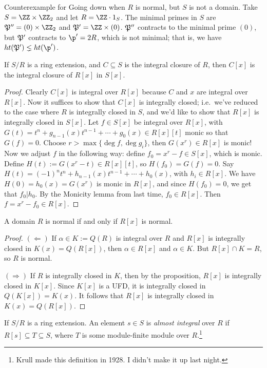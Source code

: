  \begin{example}
   Counterexample for Going down when $R$ is normal, but $S$ is not a domain. Take
   $S=\ZZ\times \ZZ_2$ and let $R=\ZZ\cdot 1_S$. The minimal primes in $S$ are
   $\P''=(0)\times \ZZ_2$ and $\P'=\ZZ\times (0)$. $\P''$ contracts to
   the minimal prime $(0)$, but $\P'$ contracts to $\p'=2R$, which is not minimal; that
   is, we have $ht(\P')\lneq ht(\p')$.
 \end{example}

 \begin{proposition}
   If $S/R$ is a ring extension, and $C\subseteq S$ is the integral closure of $R$, then
   $C[x]$ is the integral closure of $R[x]$ in $S[x]$.
 \end{proposition}
 \begin{proof}
   Clearly $C[x]$ is integral over $R[x]$ because $C$ and $x$ are integral over $R[x]$.
   Now it suffices to show that $C[x]$ is integrally closed; i.e.~we've reduced to the
   case where $R$ is integrally closed in $S$, and we'd like to show that $R[x]$ is
   integrally closed in $S[x]$. Let $f\in S[x]$ be integral over $R[x]$, with
   $G(t)=t^n+g_{n-1}(x)t^{n-1}+\cdots+g_0(x)\in R[x][t]$ monic so that $G(f)=0$. Choose
   $r> \max\{\deg f, \deg g_i\}$, then $G(x^r)\in R[x]$ is monic! Now we adjust $f$ in
   the following way: define $f_0=x^r-f\in S[x]$, which is monic. Define
   $H(t):=G(x^r-t)\in R[x][t]$, so $H(f_0)=G(f)=0$. Say $H(t)=(-1)^nt^n +
   h_{n-1}(x)t^{n-1}+\cdots+h_0(x)$, with $h_i\in R[x]$. We have $H(0)=h_0(x)=G(x^r)$ is
   monic in $R[x]$, and since $H(f_0)=0$, we get that $f_0|h_0$. By the Monicity lemma
   from last time, $f_0\in R[x]$. Then $f=x^r-f_0\in R[x]$.
 \end{proof}
 \begin{theorem}
   A domain $R$ is normal if and only if $R[x]$ is normal.
 \end{theorem}
 \begin{proof}
   $(\Leftarrow)$ If $\alpha\in K:=Q(R)$ is integral over $R$ and $R[x]$ is integrally
   closed in $K(x)=Q(R[x])$, then $\alpha\in R[x]$ and $\alpha\in K$. But $R[x]\cap K=R$,
   so $R$ is normal.

   $(\Rightarrow)$ If $R$ is integrally closed in $K$, then by the proposition, $R[x]$ is
   integrally closed in $K[x]$. Since $K[x]$ is a UFD, it is integrally closed in
   $Q(K[x])=K(x)$. It follows that $R[x]$ is integrally closed in $K(x)=Q(R[x])$.
 \end{proof}
 \begin{definition}
   If $S/R$ is a ring extension. An element $s\in S$ is \emph{almost integral} over $R$
   if $R[s]\subseteq T\subseteq S$, where $T$ is some module-finite module over
   $R$.\footnote{Krull made this definition in 1928. I didn't make it up last night.}
 \end{definition}
